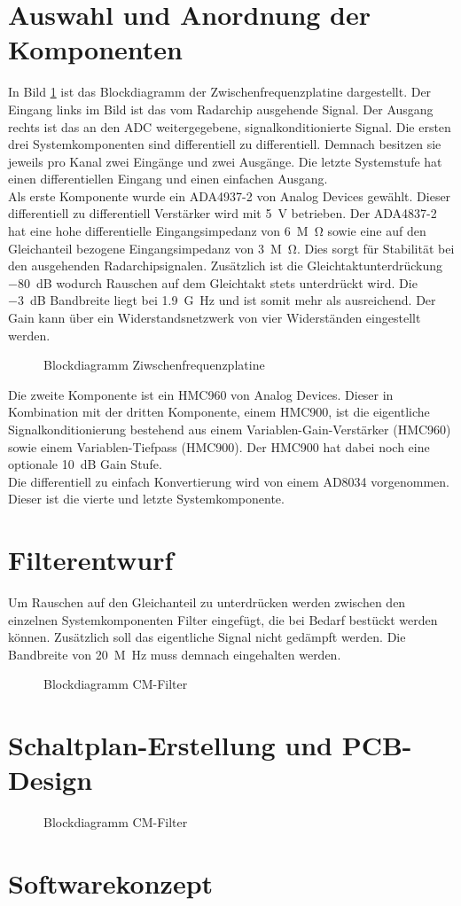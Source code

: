 \section{Auswahl und Anordnung der Komponenten}
In Bild \ref{fig:IFBoard_Block} ist das Blockdiagramm der Zwischenfrequenzplatine dargestellt. Der Eingang links im Bild ist das vom Radarchip ausgehende Signal. Der Ausgang rechts ist das an den ADC weitergegebene, signalkonditionierte Signal. Die ersten drei Systemkomponenten sind differentiell zu differentiell. Demnach besitzen sie jeweils pro Kanal zwei Eingänge und zwei Ausgänge. Die letzte Systemstufe hat einen differentiellen Eingang und einen einfachen Ausgang.\\
Als erste Komponente wurde ein ADA4937-2 von Analog Devices gewählt. Dieser differentiell zu differentiell Verstärker wird mit \SI{5}{\volt} betrieben. Der ADA4837-2 hat eine hohe differentielle Eingangsimpedanz von \SI{6}{M\ohm} sowie eine auf den Gleichanteil bezogene Eingangsimpedanz von \SI{3}{M\ohm}. Dies sorgt für Stabilität bei den ausgehenden Radarchipsignalen. Zusätzlich ist die Gleichtaktunterdrückung \SI{-80}{dB} wodurch Rauschen auf dem Gleichtakt stets unterdrückt wird. Die \SI{-3}{dB} Bandbreite liegt bei \SI{1.9}{G\hertz} und ist somit mehr als ausreichend. Der Gain kann über ein Widerstandsnetzwerk von vier Widerständen eingestellt werden. \\
\begin{figure}[tbp]
  \centering
  
  \caption{Blockdiagramm Ziwschenfrequenzplatine}
  \label{fig:IFBoard_Block}
\end{figure} 
Die zweite Komponente ist ein HMC960 von Analog Devices. Dieser in Kombination mit der dritten Komponente, einem HMC900, ist die eigentliche Signalkonditionierung bestehend aus einem Variablen-Gain-Verstärker (HMC960) sowie einem Variablen-Tiefpass (HMC900). Der HMC900 hat dabei noch eine optionale \SI{10}{dB} Gain Stufe.\\
Die differentiell zu einfach Konvertierung wird von einem AD8034 vorgenommen. Dieser ist die vierte und letzte Systemkomponente.
\section{Filterentwurf}
Um Rauschen auf den Gleichanteil zu unterdrücken werden zwischen den einzelnen Systemkomponenten Filter eingefügt, die bei Bedarf bestückt werden können. Zusätzlich soll das eigentliche Signal nicht gedämpft werden. Die Bandbreite von \SI{20}{M\hertz} muss demnach eingehalten werden.
\begin{figure}[tbp]
  \centering
  
  \caption{Blockdiagramm CM-Filter}
  \label{fig:CM_Filter_Block}
\end{figure} 
\section{Schaltplan-Erstellung und PCB-Design}
\begin{figure}[tbp]
  \centering
  
  \caption{Blockdiagramm CM-Filter}
  \label{fig:CM_Filter_Block}
\end{figure} 
\section{Softwarekonzept}



